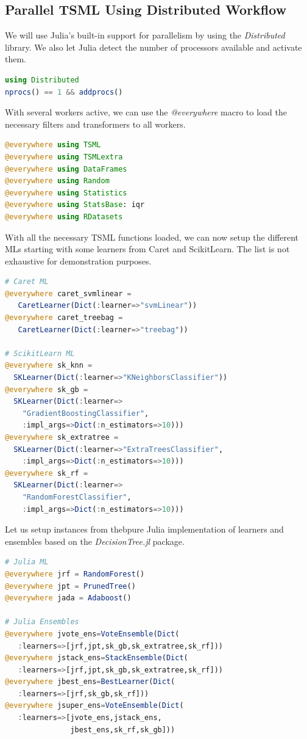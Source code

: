 \documentclass{juliacon}
\begin{document}
\subsection{Parallel TSML Using Distributed Workflow}

We will use Julia's built-in support for parallelism by using the \emph{Distributed} library. We also let Julia detect the number of processors available and activate them.

\begin{lstlisting}[language = Julia]
using Distributed 
nprocs() == 1 && addprocs()
\end{lstlisting}

With several workers active, we can use the \emph{@everywhere} macro to load the necessary filters and transformers to all workers.

\begin{lstlisting}[language = Julia]
@everywhere using TSML
@everywhere using TSMLextra
@everywhere using DataFrames
@everywhere using Random
@everywhere using Statistics
@everywhere using StatsBase: iqr
@everywhere using RDatasets
\end{lstlisting}

With all the necessary TSML functions loaded, we can now setup the different MLs starting with some learners from Caret and ScikitLearn. The list is not exhaustive for demonstration purposes.

\begin{lstlisting}[language = Julia]
# Caret ML
@everywhere caret_svmlinear = 
   CaretLearner(Dict(:learner=>"svmLinear"))
@everywhere caret_treebag = 
   CaretLearner(Dict(:learner=>"treebag"))

# ScikitLearn ML
@everywhere sk_knn = 
  SKLearner(Dict(:learner=>"KNeighborsClassifier"))
@everywhere sk_gb = 
  SKLearner(Dict(:learner=>
    "GradientBoostingClassifier",
    :impl_args=>Dict(:n_estimators=>10)))
@everywhere sk_extratree = 
  SKLearner(Dict(:learner=>"ExtraTreesClassifier",
    :impl_args=>Dict(:n_estimators=>10)))
@everywhere sk_rf = 
  SKLearner(Dict(:learner=>
    "RandomForestClassifier",
    :impl_args=>Dict(:n_estimators=>10)))
\end{lstlisting}

Let us setup instances from thebpure Julia implementation of learners and ensembles based on the \emph{DecisionTree.jl} package.

\begin{lstlisting}[language = Julia]
# Julia ML
@everywhere jrf = RandomForest()
@everywhere jpt = PrunedTree()
@everywhere jada = Adaboost()

# Julia Ensembles
@everywhere jvote_ens=VoteEnsemble(Dict(
   :learners=>[jrf,jpt,sk_gb,sk_extratree,sk_rf]))
@everywhere jstack_ens=StackEnsemble(Dict(
   :learners=>[jrf,jpt,sk_gb,sk_extratree,sk_rf]))
@everywhere jbest_ens=BestLearner(Dict(
   :learners=>[jrf,sk_gb,sk_rf]))
@everywhere jsuper_ens=VoteEnsemble(Dict(
   :learners=>[jvote_ens,jstack_ens,
               jbest_ens,sk_rf,sk_gb]))
\end{lstlisting}
\end{document}
